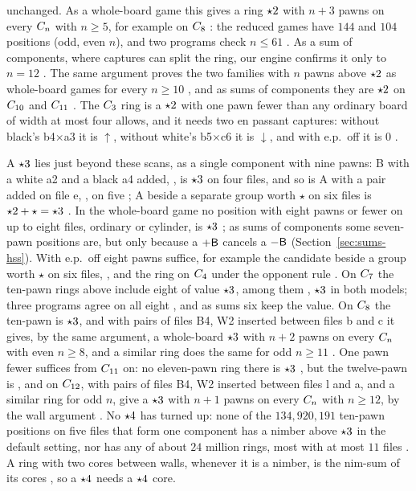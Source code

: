 unchanged. As a whole-board game this gives a ring $\mathord{\star2}$ with $n+3$ pawns on
every $C_{n}$ with $n\ge5$, for example  on $C_{8}$ : the
reduced games have $144$ and $104$ positions (odd, even $n$), and two programs check $n\le61$ . As a sum of components, where captures can split the ring, our engine confirms it only
to $n=12$ . The same argument proves the two families with $n$ pawns above $\mathord{\star2}$ as whole-board games for every
$n\ge10$ , and as sums of components they are $\mathord{\star2}$ on $C_{10}$ and $C_{11}$ . The $C_{3}$ ring is a $\mathord{\star2}$ with one pawn fewer than any ordinary board of width at most four allows,
and it needs two en passant captures: without black's b4$\times$a3 it is $\uparrow$, without white's
b5$\times$c6 it is $\downarrow$, and with e.p.\ off it is $0$ .

A $\mathord{\star3}$ lies just beyond these scans, as a single component with nine pawns: B with a white a2 and a black a4 added, , is $\mathord{\star3}$ on four
files, and so is A with a pair added on file e, , on five ; A beside a separate group worth
$\star$ on six files is $\mathord{\star2}+\star=\mathord{\star3}$ . In the whole-board game no position with eight pawns or
fewer on up to eight files, ordinary or cylinder, is $\mathord{\star3}$ ; as sums of components some seven-pawn positions are, but only because a $+\mathsf{B}$
cancels a $-\mathsf{B}$ (Section~\ref{sec:sums-hss}). With e.p.\ off eight pawns suffice, for example the candidate
beside a group worth $\star$ on six files, , and the ring  on $C_{4}$ under the opponent rule . On $C_{7}$ the ten-pawn rings above include
eight of value $\mathord{\star3}$, among them , $\mathord{\star3}$ in both models;
three programs agree on all eight , and as sums six keep the value. On $C_{8}$ the ten-pawn  is $\mathord{\star3}$, and with pairs of files B4, W2
inserted between files b and c it gives, by the same argument, a whole-board $\mathord{\star3}$ with $n+2$ pawns on every
$C_{n}$ with even $n\ge8$, and a similar ring does the same for odd $n\ge11$ . One pawn fewer
suffices from $C_{11}$ on: no eleven-pawn ring there is $\mathord{\star3}$ , but the twelve-pawn
 is , and  on $C_{12}$, with pairs of files B4, W2 inserted between files l and a, and a similar ring for odd $n$,
give a $\mathord{\star3}$ with $n+1$ pawns on every $C_{n}$ with $n\ge12$, by the wall argument . No $\mathord{\star4}$ has turned up: none of
the $134{,}920{,}191$ ten-pawn positions on five files that form one component has a nimber above $\mathord{\star3}$
in the default setting, nor has any of about $24$ million rings, most with at most $11$ files . A ring with two
cores between walls, whenever it is a nimber, is the nim-sum of its cores , so a $\mathord{\star4}$ needs a
$\mathord{\star4}$ core.

